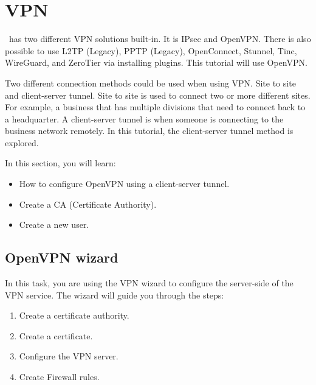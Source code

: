 \newpage

\section{VPN}
\opnsense\ has two different VPN solutions built-in. It is IPsec and OpenVPN. There is also possible to use L2TP (Legacy), PPTP (Legacy), OpenConnect, Stunnel, Tinc, WireGuard, and ZeroTier via installing plugins. This tutorial will use OpenVPN.

Two different connection methods could be used when using VPN. Site to site and client-server tunnel. Site to site is used to connect two or more different sites. For example, a business that has multiple divisions that need to connect back to a headquarter. A client-server tunnel is when someone is connecting to the business network remotely. In this tutorial, the client-server tunnel method is explored.

In this section, you will learn:
\begin{itemize}
    \item How to configure OpenVPN using a client-server tunnel.
    \item Create a CA (Certificate Authority).
    \item Create a new user.
\end{itemize}


\subsection{OpenVPN wizard} %
In this task, you are using the VPN wizard to configure the server-side of the VPN service. The wizard will guide you through the steps:

\begin{enumerate}
    \item Create a certificate authority.
    \item Create a certificate.
    \item Configure the VPN server.
    \item Create Firewall rules.
\end{enumerate}

